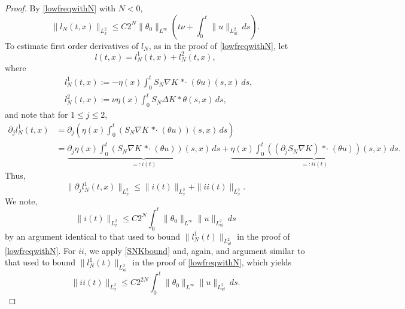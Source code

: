 \documentclass[11pt,reqno,xcolor=svgnames]{amsart}
\theoremstyle{plain}
\theoremstyle{definition}
\theoremstyle{plain}
\theoremstyle{remark}
\newcommand{\stardot}{{\mathop{* \cdot}}}
\begin{document}
\begin{proof}
By \cref{lowfreqwithN} with $N<0$,
\begin{equation}\label{IL2}
\| l_N(t,x) \|_{L^2_x} \leq C2^{N}\| \theta_{0}\|_{L^{\infty}}\left(t\nu + \int_0^t \| u \|_{L^2_{ul}}\, ds\right).
\end{equation}
To estimate first order derivatives of $l_N$, as in the proof of \cref{lowfreqwithN}, let $$l(t,x) =l_N^1(t,x) +l_N^2(t,x),$$ where 
\begin{equation*}
\begin{split}
&l_N^1(t,x) := -\eta(x)\int_0^t S_{N}\nabla K \stardot (\theta u) (s,x) \, ds,\\
&l_N^2(t,x) :=  \nu\eta(x)\int_0^t S_{N}\Delta K \ast \theta(s,x) \, ds, 
\end{split}
\end{equation*} 
and note that for $1\leq j \leq 2$,  
\begin{equation*}
\begin{split}
\partial_j l_N^1(t,x)  &=  \partial_j\left (\eta(x)\int_0^t (S_{N}\nabla K \stardot (\theta u))(s,x)  \, ds \right)\\
&= \underbrace{ \partial_j\eta(x)\int_0^t (S_{N}\nabla K \stardot (\theta u))(s,x)  \, ds}_{=: i(t)}  + \underbrace{ \eta(x)\int_0^t ((\partial_jS_{N}\nabla K) \stardot (\theta u))(s,x)  \, ds }_{=: ii(t)}.
\end{split}
\end{equation*}
Thus,
$$\| \partial_j l_N^1(t,x)\|_{L^2_x}\leq \|i(t)\|_{L^2_x} + \|ii(t)\|_{L^2_x}.$$
We note, $$\|i(t)\|_{L^2_x}\leq C2^{N}\int_0^t\| \theta_0\|_{L^{\infty}} \| u \|_{L^2_{ul}}\, ds$$ by an argument identical to that used to bound $\|l_N^1 (t)\|_{L^2_{ul}}$ in the proof of \cref{lowfreqwithN}.  For $ii$, we apply \cref{SNKbound} and, again, and argument similar to that used to bound $\|l_N^1 (t)\|_{L^2_{ul}}$ in the proof of \cref{lowfreqwithN}, which yields $$\|ii(t)\|_{L^2_x}\leq C2^{2N}\int_0^t\| \theta_0\|_{L^{\infty}} \| u \|_{L^2_{ul}}\, ds.$$   


\end{proof}
\end{document}

